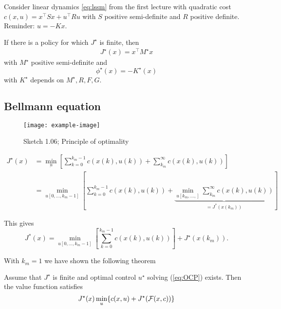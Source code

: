 \begin{example}
    Consider linear dynamics \ref{eq:lssm} %
     from the first lecture with 
    quadratic cost \(c(x,u)=x^\intercal Sx+u^\intercal Ru\) with \(S\) positive semi-definite and 
    \(R\) positive definite.
    Reminder: \(u=-Kx\).

    If there is a policy for which \(J^\star\) is finite, then 
    \begin{align*}
        J^\star(x)=x^\intercal M^\star x
    \end{align*}
    with \(M^\star\) positive semi-definite and 
    \[\phi^\star(x)=-K^\star(x)\]
    with \(K^\star\) depends on \(M^\star,R,F,G\). 
\end{example}

\subsection*{Bellmann equation}
\begin{figure}[H]\label{fig:1.06}
    \centering
    \texttt{[image: example-image]}
    \caption{Sketch 1.06; Principle of optimality}
\end{figure}


\begin{align*}
    J^\star(x)&=\min_{\underbar{u}}\left[\sum_{k=0}^{k_m-1}c(x(k),u(k))+\sum_{k_m}^\infty c(x(k),u(k))\right]\\
    &=\min_{u[0,\dots,k_m-1]}\left[\sum_{k=0}^{k_m-1}c(x(k),u(k))+\underbrace{\min_{u[k_m,\dots,]}\sum_{k_m}^\infty c(x(k),u(k))}_{=J^*(x(k_m))}\right]
\end{align*}

This gives 
\[J^*(x)=\min_{u[0,\dots,k_m-1]}\left[\sum_{k=0}^{k_m-1}c(x(k),u(k))\right]+J^\star(x(k_m)).\]

With \(k_m=1\) we have shown the following theorem 
\begin{theorem}\label{thm:1.13}
    Assume that \(J^\star\) is finite and optimal control \(u^\star\) solving (\ref{eq:OCP}) exists.
    Then the value function satisfies 
    \begin{equation}\label{eq:bellmann}
        J^\star(x)\min_{u}\{c(x,u)+J^\star(\mathcal{F}(x,c))\}
    \end{equation}
\end{theorem}

